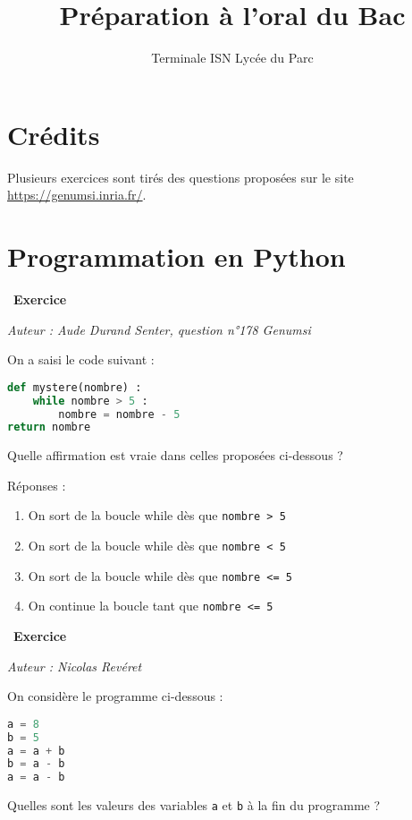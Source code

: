 \documentclass[
  11pt,
]{article}
\title{Préparation à l'oral du Bac}
\author{Terminale ISN Lycée du Parc}
\date{}
\newcommand{\passthrough}[1]{#1}
\providecommand{\tightlist}{%
  \setlength{\itemsep}{0pt}\setlength{\parskip}{0pt}}
\newcounter{exo}
\newenvironment{exercice}[1]
{\par \medskip   \addtocounter{exo}{1} \noindent  
\begin{bclogo}[arrondi =0.1,   noborder = true, logo=\bccrayon, marge=4]{~\textbf{Exercice} \textbf{\theexo} {\itshape #1} }  \par}
{
\end{bclogo}
 \par \bigskip }
\newcounter{prop}
\newcounter{def}
\newcounter{prog}
\begin{document}
\maketitle

\renewcommand*\contentsname{Table des matières}
{
\hypersetup{linkcolor=}
\setcounter{tocdepth}{3}
\tableofcontents
}
\hypertarget{cruxe9dits}{%
\section{Crédits}\label{cruxe9dits}}

Plusieurs exercices sont tirés des questions proposées sur le site
\url{https://genumsi.inria.fr/}.

\hypertarget{programmation-en-python}{%
\section{Programmation en Python}\label{programmation-en-python}}

\begin{exercice}{}

\emph{Auteur : Aude Durand Senter, question n°178 Genumsi}

On a saisi le code suivant :

\begin{lstlisting}[language=Python]
def mystere(nombre) :
    while nombre > 5 :
        nombre = nombre - 5
return nombre
\end{lstlisting}

Quelle affirmation est vraie dans celles proposées ci-dessous ?

Réponses :

\begin{enumerate}
\def\labelenumi{\Alph{enumi})}
\tightlist
\item
  On sort de la boucle while dès que
  \passthrough{\lstinline!nombre > 5!}
\item
  On sort de la boucle while dès que
  \passthrough{\lstinline!nombre < 5!}
\item
  On sort de la boucle while dès que
  \passthrough{\lstinline!nombre <= 5!}
\item
  On continue la boucle tant que \passthrough{\lstinline!nombre <= 5!}
\end{enumerate}

\end{exercice}

\begin{exercice}{}

\emph{Auteur : Nicolas Revéret}

On considère le programme ci-dessous :

\begin{lstlisting}[language=Python]
a = 8
b = 5
a = a + b
b = a - b
a = a - b
\end{lstlisting}

Quelles sont les valeurs des variables \passthrough{\lstinline!a!} et
\passthrough{\lstinline!b!} à la fin du programme ?

\end{exercice}
\end{document}
